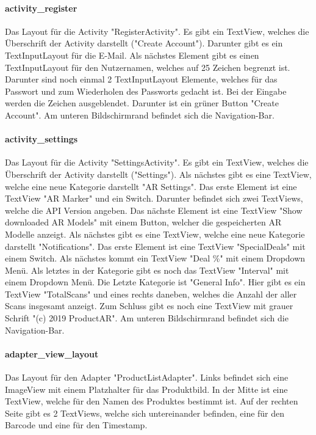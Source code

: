 \documentclass{scrartcl}
\begin{document}
\paragraph{activity\_register} \mbox{} 

\noindent Das Layout für die Activity "RegisterActivity". Es gibt ein TextView, welches die Überschrift der Activity darstellt ("Create Account"). Darunter gibt es ein TextInputLayout für die E-Mail. Als nächstes Element gibt es einen TextInputLayout für den Nutzernamen, welches auf 25 Zeichen begrenzt ist. Darunter sind noch einmal 2 TextInputLayout Elemente, welches für das Passwort und zum Wiederholen des Passworts gedacht ist. Bei der Eingabe werden die Zeichen ausgeblendet. Darunter ist ein grüner Button "Create Account". Am unteren Bildschirmrand befindet sich die Navigation-Bar.

\paragraph{activity\_settings} \mbox{} 

\noindent Das Layout für die Activity "SettingsActivity". Es gibt ein TextView, welches die Überschrift der Activity darstellt ("Settings"). Als nächstes gibt es eine TextView, welche eine neue Kategorie darstellt "AR Settings". Das erste Element ist eine TextView "AR Marker" und ein Switch. Darunter befindet sich zwei TextViews, welche die API Version angeben. Das nächste Element ist eine TextView "Show downloaded AR Models" mit einem Button, welcher die gespeicherten AR Modelle anzeigt. Als nächstes gibt es eine TextView, welche eine neue Kategorie darstellt "Notifications". Das erste Element ist eine TextView "SpecialDeals" mit einem Switch. Als nächstes kommt ein TextView "Deal \%" mit einem Dropdown Menü. Als letztes in der Kategorie gibt es noch das TextView "Interval" mit einem Dropdown Menü. Die Letzte Kategorie ist "General Info". Hier gibt es ein TextView "TotalScans" und eines rechts daneben, welches die Anzahl der aller Scans insgesamt anzeigt. Zum Schluss gibt es noch eine TextView mit grauer Schrift "(c) 2019 ProductAR". Am unteren Bildschirmrand befindet sich die Navigation-Bar.

\paragraph{adapter\_view\_layout} \mbox{} 

\noindent Das Layout für den Adapter "ProductListAdapter". Links befindet sich eine ImageView mit einem Platzhalter für das Produktbild. In der Mitte ist eine TextView, welche für den Namen des Produktes bestimmt ist. Auf der rechten Seite gibt es 2 TextViews, welche sich untereinander befinden, eine für den Barcode und eine für den Timestamp.
\end{document}
